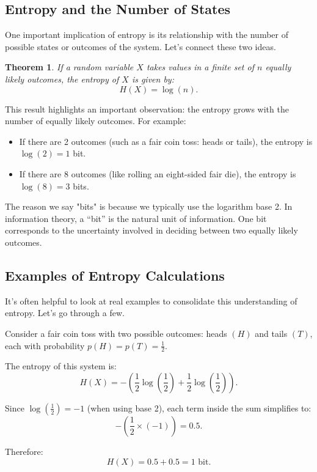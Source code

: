 \documentclass[12pt,a4paper]{article}
\newtheorem{theorem}{Theorem}[section]
\newenvironment{thmbox}[1][]{%
  \begin{tcolorbox}[enhanced, breakable, colback=thmcolor, colframe=blue!50!black, title=#1, fonttitle=\bfseries, arc=3pt, boxrule=0.5pt]
}{\end{tcolorbox}}
\newenvironment{exbox}[1][]{%
  \begin{tcolorbox}[enhanced, breakable, colback=excolor, colframe=brown!50!black, title=#1, fonttitle=\bfseries, arc=3pt, boxrule=0.5pt]
}{\end{tcolorbox}}
\begin{document}
\subsection{Entropy and the Number of States}

One important implication of entropy is its relationship with the number of possible states or outcomes of the system. Let’s connect these two ideas.

\begin{thmbox}[Entropy and State Space]
\begin{theorem}
    If a random variable $X$ takes values in a finite set of $n$ equally likely outcomes, the entropy of $X$ is given by:
    \[
    H(X) = \log(n).
    \]
\end{theorem}
\end{thmbox}

This result highlights an important observation: the entropy grows with the number of equally likely outcomes. For example:

\begin{itemize}
    \item If there are 2 outcomes (such as a fair coin toss: heads or tails), the entropy is $\log(2) = 1$ bit.
    \item If there are 8 outcomes (like rolling an eight-sided fair die), the entropy is $\log(8) = 3$ bits.
\end{itemize}

The reason we say "bits" is because we typically use the logarithm base 2. In information theory, a “bit” is the natural unit of information. One bit corresponds to the uncertainty involved in deciding between two equally likely outcomes.

\subsection{Examples of Entropy Calculations}

It’s often helpful to look at real examples to consolidate this understanding of entropy. Let’s go through a few.

\begin{exbox}[Example: Fair Coin Toss]
    Consider a fair coin toss with two possible outcomes: heads $(H)$ and tails $(T)$, each with probability $p(H) = p(T) = \frac{1}{2}$.

    The entropy of this system is:
    \[
    H(X) = -\left( \frac{1}{2} \log \left(\frac{1}{2}\right) + \frac{1}{2} \log \left(\frac{1}{2}\right) \right).
    \]

    Since $\log \left(\frac{1}{2}\right) = -1$ (when using base 2), each term inside the sum simplifies to:
    \[
    -\left(\frac{1}{2} \times (-1)\right) = 0.5.
    \]

    Therefore:
    \[
    H(X) = 0.5 + 0.5 = 1 \text{ bit}.
    \]
\end{exbox}
\end{document}
